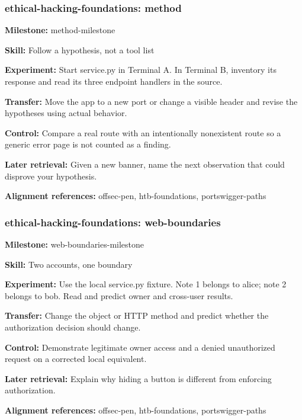 \subsubsection{ethical-hacking-foundations: method}
\noindent\textbf{Milestone:} method-milestone\par
\noindent\textbf{Skill:} Follow a hypothesis, not a tool list\par
\noindent\textbf{Experiment:} Start service.py in Terminal A. In Terminal B, inventory its response and read its three endpoint handlers in the source.\par
\noindent\textbf{Transfer:} Move the app to a new port or change a visible header and revise the hypotheses using actual behavior.\par
\noindent\textbf{Control:} Compare a real route with an intentionally nonexistent route so a generic error page is not counted as a finding.\par
\noindent\textbf{Later retrieval:} Given a new banner, name the next observation that could disprove your hypothesis.\par
\noindent\textbf{Alignment references:} offsec-pen, htb-foundations, portswigger-paths\par
\subsubsection{ethical-hacking-foundations: web-boundaries}
\noindent\textbf{Milestone:} web-boundaries-milestone\par
\noindent\textbf{Skill:} Two accounts, one boundary\par
\noindent\textbf{Experiment:} Use the local service.py fixture. Note 1 belongs to alice; note 2 belongs to bob. Read  and predict owner and cross-user results.\par
\noindent\textbf{Transfer:} Change the object or HTTP method and predict whether the authorization decision should change.\par
\noindent\textbf{Control:} Demonstrate legitimate owner access and a denied unauthorized request on a corrected local equivalent.\par
\noindent\textbf{Later retrieval:} Explain why hiding a button is different from enforcing authorization.\par
\noindent\textbf{Alignment references:} offsec-pen, htb-foundations, portswigger-paths\par
